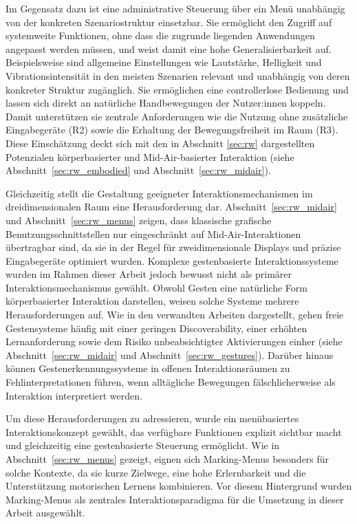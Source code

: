 Im Gegensatz dazu ist eine administrative Steuerung über ein Menü unabhängig von der konkreten Szenariostruktur einsetzbar. Sie ermöglicht den Zugriff auf systemweite Funktionen, ohne dass die zugrunde liegenden Anwendungen angepasst werden müssen, und weist damit eine hohe Generalisierbarkeit auf. Beispielsweise sind allgemeine Einstellungen wie Lautstärke, Helligkeit und Vibrationsintensität in den meisten Szenarien relevant und unabhängig von deren konkreter Struktur zugänglich.
Sie ermög\-lichen eine controllerlose Bedienung und lassen sich direkt an natürliche Handbewegungen der Nutzer:innen koppeln. Damit unterstützen sie zentrale Anforderungen wie die Nutzung ohne zusätzliche Eingabegeräte (R2) sowie die Erhaltung der Bewegungsfreiheit im Raum (R3). Diese Einschätzung deckt sich mit den in Abschnitt \ref{sec:rw} dargestellten Potenzialen körper\-basierter und Mid-Air-basierter Interaktion (siehe Abschnitt~\ref{sec:rw_embodied} und Abschnitt~\ref{sec:rw_midair}).

Gleichzeitig stellt die Gestaltung geeigneter Interaktionsmechanismen im dreidimensionalen Raum eine Herausforderung dar.
Abschnitt~\ref{sec:rw_midair} und Abschnitt~\ref{sec:rw_menus} zeigen, dass klassische grafische Benutzungsschnittstellen nur eingeschränkt auf Mid-Air-Interaktionen übertragbar sind, da sie in der Regel für zweidimensionale Displays und präzise Eingabegeräte optimiert wurden.
Komplexe gestenbasierte Interaktionssysteme wurden im Rahmen dieser Arbeit jedoch bewusst nicht als primärer Interaktionsmechanismus gewählt. Obwohl Gesten eine natürliche Form körper\-basierter Interaktion darstellen, weisen solche Systeme mehrere Herausforderungen auf. Wie in den verwandten Arbeiten dargestellt, gehen freie Gestensysteme häufig mit einer geringen Discoverability, einer erhöhten Lernanforderung sowie dem Risiko unbeabsichtigter Aktivierungen einher (siehe Abschnitt~\ref{sec:rw_midair} und Abschnitt~\ref{sec:rw_gestures}). Darüber hinaus können Gestenerkennungssysteme in offenen Interaktionsräumen zu Fehlinterpretationen führen, wenn alltägliche Bewegungen fälschlicherweise als Interaktion interpretiert werden.

Um diese Herausforderungen zu adressieren, wurde ein menübasiertes Interaktionskonzept gewählt, das verfügbare Funktionen explizit sichtbar macht und gleichzeitig eine gestenbasierte Steuerung ermöglicht. Wie in Abschnitt~\ref{sec:rw_menus} gezeigt, eignen sich Marking-Menus besonders für solche Kontexte, da sie kurze Zielwege, eine hohe Erlernbarkeit und die Unterstützung motorischen Lernens kombinieren.
Vor diesem Hintergrund wurden Marking-Menus als zentrales Interaktionsparadigma für die Umsetzung in dieser Arbeit ausgewählt.


